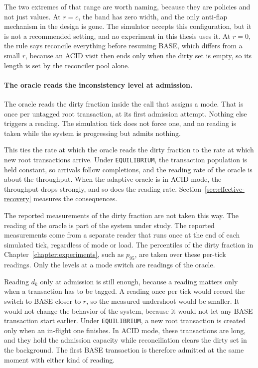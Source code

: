 The two extremes of that range are worth naming, because they are policies and
not just values. At $r = c$, the band has zero width, and the only anti-flap
mechanism in the design is gone. The
simulator accepts this configuration, but it is not a recommended setting, and no
experiment in this thesis uses it. At $r = 0$, the rule says reconcile everything
before resuming BASE, which differs from a small $r$, because an ACID visit then
ends only when the dirty set is empty, so its length is set by the reconciler
pool alone.

\paragraph{The oracle reads the inconsistency level at
  admission.}\label{sec:approach-sampling}\label{sec:approach-samplers} The oracle
reads the dirty fraction inside the call that assigns a mode. That is once per
untagged root transaction, at its first admission attempt. Nothing else triggers
a reading. The simulation tick does not force one, and no reading is taken while
the system is progressing but admits nothing.

This ties the rate at which the oracle reads the dirty fraction to the rate at
which new root transactions arrive. Under \texttt{EQUILIBRIUM}, the transaction
population is held constant, so arrivals follow completions, and the reading
rate of the oracle is about the throughput. When the adaptive oracle is in ACID
mode, the throughput drops strongly, and so does the reading rate.
Section~\ref{sec:effective-recovery} measures the consequences.

The reported measurements of the dirty fraction are not taken this way. The
reading of the oracle is part of the system under study. The reported
measurements come from a separate reader that runs once at the end of each
simulated tick, regardless of mode or load. The percentiles of the dirty
fraction in Chapter~\ref{chapter:experiments}, such as $p_{95}$, are taken over
these per-tick readings. Only the levels at a mode switch are readings of the
oracle.

Reading $d_k$ only at admission is still enough, because a reading matters only
when a transaction has to be tagged. A reading once per tick would record the
switch to BASE closer to $r$, so the measured undershoot would be smaller. It
would not change the behavior of the system, because it would not let any BASE
transaction start earlier. Under \texttt{EQUILIBRIUM}, a new root transaction is
created only when an in-flight one finishes. In ACID mode, these transactions are
long, and they hold the admission capacity while reconciliation clears the dirty
set in the background. The first BASE transaction is therefore admitted at the
same moment with either kind of reading.

